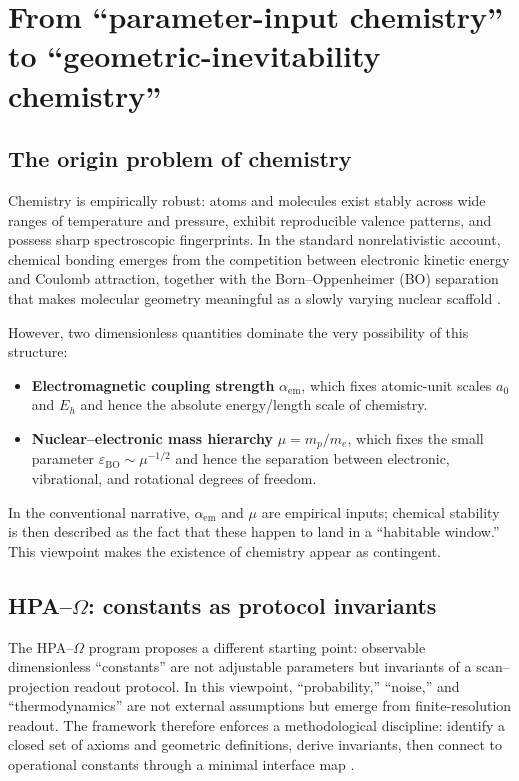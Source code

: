 \section{From ``parameter-input chemistry'' to ``geometric-inevitability chemistry''}
\label{sec:introduction}

\subsection{The origin problem of chemistry}
Chemistry is empirically robust: atoms and molecules exist stably across wide ranges of temperature and pressure, exhibit reproducible valence patterns, and possess sharp spectroscopic fingerprints. In the standard nonrelativistic account, chemical bonding emerges from the competition between electronic kinetic energy and Coulomb attraction, together with the Born--Oppenheimer (BO) separation that makes molecular geometry meaningful as a slowly varying nuclear scaffold \cite{BornOppenheimer1927,SzaboOstlund1996}.

However, two dimensionless quantities dominate the very possibility of this structure:
\begin{itemize}
\item \textbf{Electromagnetic coupling strength} $\alpha_{\mathrm{em}}$, which fixes atomic-unit scales $a_0$ and $E_h$ and hence the absolute energy/length scale of chemistry.
\item \textbf{Nuclear--electronic mass hierarchy} $\mu=m_p/m_e$, which fixes the small parameter $\varepsilon_{\mathrm{BO}}\sim \mu^{-1/2}$ and hence the separation between electronic, vibrational, and rotational degrees of freedom.
\end{itemize}
In the conventional narrative, $\alpha_{\mathrm{em}}$ and $\mu$ are empirical inputs; chemical stability is then described as the fact that these happen to land in a ``habitable window.'' This viewpoint makes the existence of chemistry appear as contingent.

\subsection{HPA--\texorpdfstring{$\Omega$}{Omega}: constants as protocol invariants}
The HPA--$\Omega$ program proposes a different starting point: observable dimensionless ``constants'' are not adjustable parameters but invariants of a scan--projection readout protocol. In this viewpoint, ``probability,'' ``noise,'' and ``thermodynamics'' are not external assumptions but emerge from finite-resolution readout. The framework therefore enforces a methodological discipline: identify a closed set of axioms and geometric definitions, derive invariants, then connect to operational constants through a minimal interface map \cite{Ma2025HPOT,Ma2025FoP,Ma2025PCG}.

